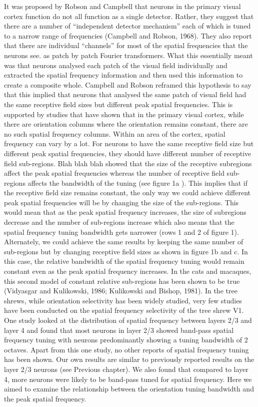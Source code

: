 		It was proposed by Robson and Campbell that neurons in the primary visual cortex function do not all function as a single detector. Rather, they suggest that there are a number of “independent detector mechanism” each of which is tuned to a narrow range of frequencies (Campbell and Robson, 1968).  They also report that there are individual “channels” for most of the spatial frequencies that the neurons see. as patch by patch Fourier transformers. What this essentially meant was that neurons analysed each patch of the visual field individually and extracted the spatial frequency information and then used this information to create a composite whole. Campbell and Robson reframed this hypothesis to say that this implied that neurons that analysed the same patch of visual field had the same receptive field sizes but different peak spatial frequencies. This is supported by studies that have shown that in the primary visual cortex, while there are orientation columns where the orientation remains constant, there are no such spatial frequency columns. Within an area of the cortex, spatial frequency can vary by a lot.
	For neurons to have the same receptive field size but different peak spatial frequencies, they should have different number of receptive field sub-regions. Blah blah blah showed that the size of the receptive subregions affect the peak spatial frequencies whereas the number of receptive field sub-regions affects the bandwidth of the tuning (see figure 1a ). This implies that if the receptive field size remains constant, the only way we could achieve different peak spatial frequencies will be by changing the size of the sub-regions. This would mean that as the peak spatial frequency increases, the size of subregions decrease and the number of sub-regions increase which also means that the spatial frequency tuning bandwidth gets narrower (rows 1 and 2 of figure 1). Alternately, we could achieve the same results by keeping the same number of sub-regions but by changing receptive field sizes as shown in figure 1b and c. In this case, the relative bandwidth of the spatial frequency tuning would remain constant even as the peak spatial frequency increases. In the cats and macaques, this second model of constant relative sub-regions has been shown to be true (Vidyasgar and Kulikowski, 1986; Kulikowski and Bishop, 1981).
	In the tree shrews, while orientation selectivity has been widely studied, very few studies have been conducted on the spatial frequency selectivity of the tree shrew V1. One study looked at the distribution of spatial frequency between layers 2/3 and layer 4 and found that most neurons in layer 2/3 showed band-pass spatial frequency tuning with neurons predominantly showing a tuning bandwidth of 2 octaves. Apart from this one study, no other reports of spatial frequency tuning has been shown. Our own results are similar to previously reported results on the layer 2/3 neurons (see Previous chapter). We also found that compared to layer 4, more neurons were likely to be band-pass tuned for spatial frequency. Here we aimed to examine the relationship between the orientation tuning bandwidth and the peak spatial frequency.
	
